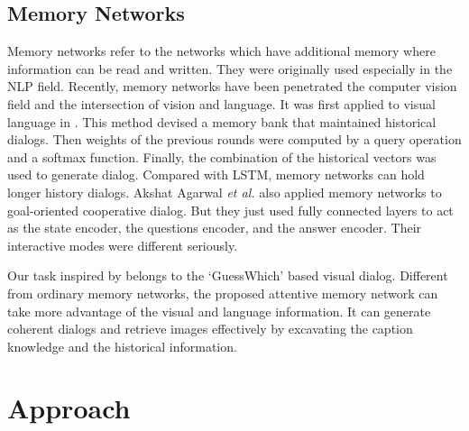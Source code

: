 \documentclass[review]{elsarticle}
\begin{document}
	\subsection{Memory Networks}
	Memory networks \cite{DBLP:journals/corr/WestonCB14, sukhbaatar2015end, xiong2016dynamic, vaswani2017attention, danihelka2016associative} refer to the networks which have additional memory where information can be read and written. They were originally used especially in the NLP field.
	Recently, memory networks have been penetrated the computer vision field and the intersection of vision and language. It was first applied to visual language in \cite{DBLP:conf/cvpr/DasKGSYMPB17}. This method devised a memory bank that maintained historical dialogs. Then weights of the previous rounds were computed by a query operation and a softmax function. 
	Finally, the combination of the historical vectors was used to generate dialog. Compared with LSTM, memory networks can hold longer history dialogs. 
	Akshat Agarwal \textit{et al.} \cite{DBLP:conf/atal/AgarwalGSLS19} also applied memory networks to goal-oriented cooperative dialog. But they just used fully connected layers to act as the state encoder, the questions encoder, and the answer encoder. 
	Their interactive modes were different seriously.
	
	Our task inspired by \cite{DBLP:conf/iccv/DasKMLB17} belongs to the `GuessWhich' based visual dialog. Different from ordinary memory networks, the proposed attentive memory network can take more advantage of the visual and language information.
	It can generate coherent dialogs and retrieve images effectively by excavating the caption knowledge and the historical information.

	\section{Approach}
	
\end{document}

